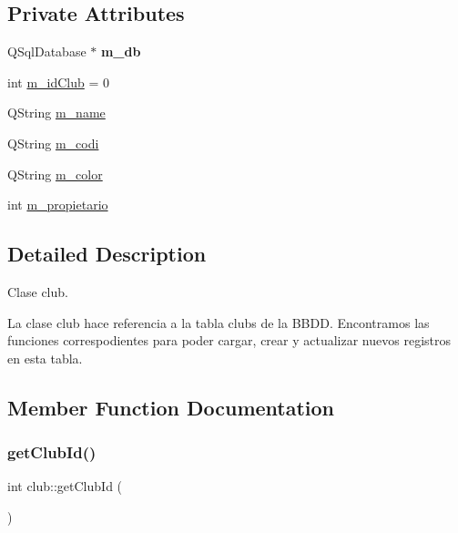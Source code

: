\subsection*{Private Attributes}
\begin{DoxyCompactItemize}
\item 
\mbox{\label{classclub_a10157a609edf98fe5ce66a4974cdea84}} 
Q\+Sql\+Database $\ast$ {\bfseries m\+\_\+db}
\item 
int \mbox{\hyperlink{classclub_a903a48e2c7351cac51ecbf416f905d6e}{m\+\_\+id\+Club}} = 0
\item 
Q\+String \mbox{\hyperlink{classclub_a5662adc7efe68e0cdfb873137d8ed019}{m\+\_\+name}}
\item 
Q\+String \mbox{\hyperlink{classclub_ade18982a1b4b4a30ca9317bd9490dd7d}{m\+\_\+codi}}
\item 
Q\+String \mbox{\hyperlink{classclub_ae8238bd2abbdd6fef94f03c2d7c846b1}{m\+\_\+color}}
\item 
int \mbox{\hyperlink{classclub_ab1d8565c370614f5903c2cc199216af9}{m\+\_\+propietario}}
\end{DoxyCompactItemize}


\subsection{Detailed Description}
Clase club. 

La clase club hace referencia a la tabla \textquotesingle{}clubs\textquotesingle{} de la B\+B\+DD. Encontramos las funciones correspodientes para poder cargar, crear y actualizar nuevos registros en esta tabla. 

\subsection{Member Function Documentation}
\mbox{\label{classclub_ac6e69f12ebd2a446f942860bf08fd1fa}} 
\subsubsection{\texorpdfstring{get\+Club\+Id()}{getClubId()}}
{\footnotesize\ttfamily int club\+::get\+Club\+Id (\begin{DoxyParamCaption}{ }\end{DoxyParamCaption})}



